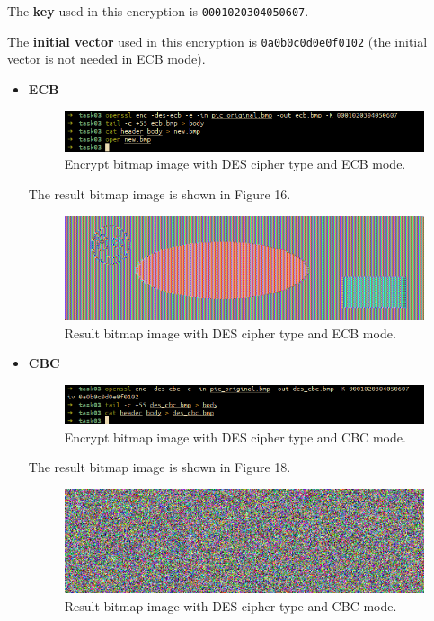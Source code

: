 \documentclass{article}
\begin{document}
The \textbf{key} used in this encryption is \texttt{0001020304050607}.

The \textbf{initial vector} used in this encryption is \texttt{0a0b0c0d0e0f0102}
(the initial vector is not needed in ECB mode).

\begin{itemize}
    \item \textbf{ECB}
        \begin{figure}[!ht]
            \centering
            \includegraphics[scale=0.68]{task03_des.png}
            \caption{Encrypt bitmap image with DES cipher type and ECB mode.}
        \end{figure}

        The result bitmap image is shown in Figure 16.

        \begin{figure}[!ht]
            \centering
            \includegraphics[scale=0.68]{des_ecb.png}
            \caption{Result bitmap image with DES cipher type and ECB mode.}
        \end{figure}

    \item \textbf{CBC}
        \begin{figure}[!ht]
            \centering
            \includegraphics[scale=0.68]{task03_des_2.png}
            \caption{Encrypt bitmap image with DES cipher type and CBC mode.}
        \end{figure}

        The result bitmap image is shown in Figure 18.

        \begin{figure}[!ht]
            \centering
            \includegraphics[scale=0.68]{des_cbc.png}
            \caption{Result bitmap image with DES cipher type and CBC mode.}
        \end{figure}
\end{itemize}
\end{document}

